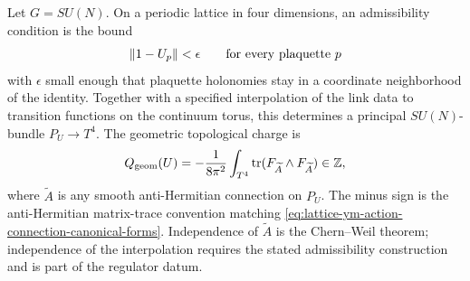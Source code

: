 \begin{definition}
\label{def:admissible-geometric-topological-charge}
Let \(G=SU(N)\).  On a periodic lattice in four dimensions, an admissibility
condition is the bound
\[
  \|1-U_p\|<\epsilon
  \qquad{\rm for\ every\ plaquette}\ p
\]
with \(\epsilon\) small enough that plaquette holonomies stay in a coordinate
neighborhood of the identity.  Together with a specified interpolation of the
link data to transition functions on the continuum torus, this determines a
principal \(SU(N)\)-bundle \(P_U\to T^4\).  The geometric topological charge is
\[
  Q_{\rm geom}(U)
  =
  -\frac{1}{8\pi^2}\int_{T^4}\operatorname{tr}(F_{\widetilde A}\wedge
  F_{\widetilde A})
  \in\mathbb Z,
\]
where \(\widetilde A\) is any smooth anti-Hermitian connection on \(P_U\).  The
minus sign is the anti-Hermitian matrix-trace convention matching
\eqref{eq:lattice-ym-action-connection-canonical-forms}.  Independence of
\(\widetilde A\) is the Chern--Weil theorem; independence of the interpolation
requires the stated admissibility construction and is part of the regulator
datum.
\end{definition}

